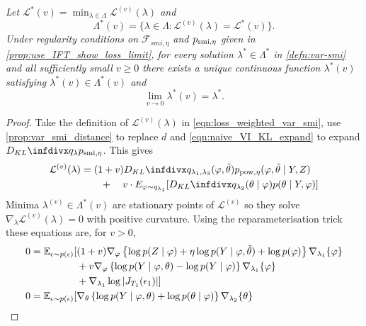 {\it
  Let $\mathcal{L}^*(v)=\min_{\lambda\in\Lambda}\mathcal{L}^{(v)}(\lambda)$
  and
  \[
    \Lambda^*(v)=\{\lambda\in \Lambda: \mathcal{L}^{(v)}(\lambda)=\mathcal{L}^*(v)\}.
  \]
  Under regularity conditions on $\mathcal{F}_{smi,\eta}$ and $p_{ \operatorname{\text{smi}}, \eta}$ given in \cref{prop:use_IFT_show_loss_limit}, for every solution $\lambda^*\in \Lambda^*$ in \cref{defn:var-smi} and all sufficiently small $v\ge 0$ there exists a unique continuous function $\lambda^*(v)$ satisfying $\lambda^*(v)\in \Lambda^*(v)$ and \[\lim_{v\to 0}\lambda^*(v)=\lambda^*.\]
}
\begin{proof}\label{proof:smi-show-p3-extra}
  Take the definition of $\mathcal{L}^{(v)}(\lambda)$ in \cref{eqn:loss_weighted_var_smi}, use \cref{prop:var_smi_distance} to replace $d$ and \cref{eqn:naive_VI_KL_expand} to expand $\kl{q_{\lambda}}{p_{\smi, \eta}}$. This gives
  \begin{align*}
    \mathcal{L}^{(v)}(\lambda)
     & =(1+v)\kl{q_{\lambda_1, \lambda_3}(\varphi, \tilde\theta)}{p_{\pow, \eta}(\varphi,\tilde\theta \mid Y,Z)}
    \\
     & \qquad+\quad v\cdot E_{\varphi\sim q_{\lambda_1}}[\kl{q_{\lambda_2}(\theta\mid \varphi)}{p(\theta \mid Y,\varphi)}]
  \end{align*}
  Minima $\lambda^{(v)}\in\Lambda^*(v)$ are stationary points of $\mathcal{L}^{(v)}$ so they solve $\nabla_{\lambda}\mathcal{L}^{(v)}(\lambda)=0$ with positive curvature. Using the reparameterisation trick these equations are, for $v>0$,
  \begin{align}
    0 = \E_{\epsilon \sim p(\epsilon)}[ & (1+v)\nabla_{\varphi} \left\{ \log p(Z \mid \varphi) + \eta \log p(Y \mid \varphi, \tilde\theta) + \log p(\varphi) \right\} \nabla_{\lambda_1} \{ \varphi \} \nonumber
    \\
                                        & + v\nabla_{\varphi} \left\{ \log p(Y \mid \varphi, \theta) - \log p(Y\mid \varphi) \right\} \nabla_{\lambda_1} \{ \varphi \} \nonumber                                 \\
                                        & + \nabla_{\lambda_1} \log \left\vert J_{T_1}(\epsilon_1) \right\vert  ] \label{eq:root_loss_l1_smi_general}                                                            \\
    0 = \E_{\epsilon \sim p(\epsilon)}[ & \nabla_{\theta} \left\{ \log p(Y \mid \varphi, \theta) + \log p(\theta \mid \varphi) \right\} \nabla_{\lambda_2} \{ \theta \} \nonumber                                \\

\end{align}
\end{proof}
